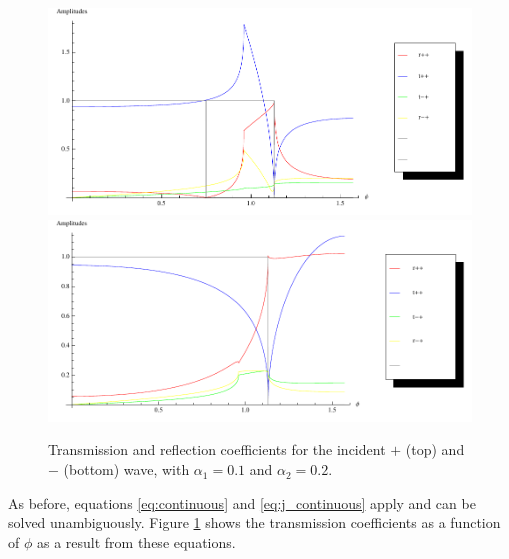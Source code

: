 \begin{figure}
    \begin{center}
        \includegraphics{nonzero-plus.pdf}
        \includegraphics{nonzero-minus.pdf}
    \end{center}
    \caption{Transmission and reflection coefficients for the
        incident $+$ (top) and $-$ (bottom) wave, with
        $\alpha_1 = 0.1$ and $\alpha_2 = 0.2$.}
    \label{fig:plots-nonzero}
\end{figure}

As before, equations \ref{eq:continuous} and \ref{eq:j_continuous}
apply and can be solved unambiguously. Figure \ref{fig:plots-nonzero}
shows the transmission coefficients as a function of $\phi$ as a
result from these equations.

%
%

